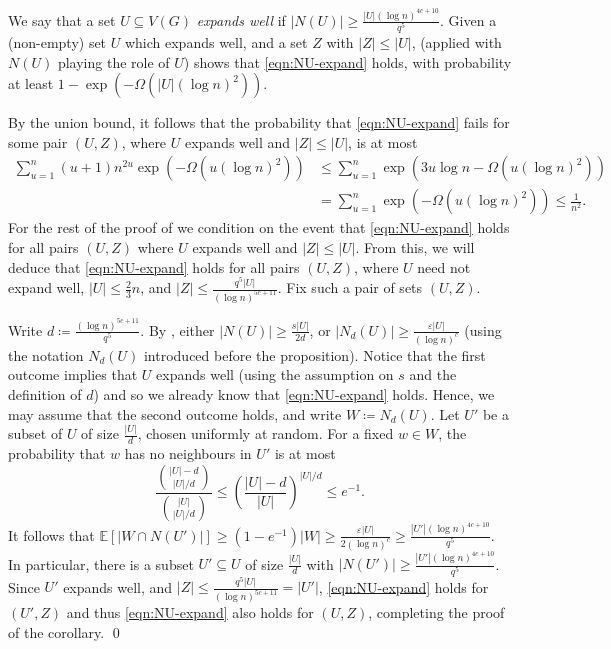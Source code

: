 \documentclass[10pt]{article}
\theoremstyle{plain}
\numberwithin{theorem}{section}
\theoremstyle{definition}
\theoremstyle{remark}
\renewenvironment{proof}[1][]{\begin{trivlist}
\item[\hspace{\labelsep}{\bf\noindent Proof#1.\/}] }{\qed\end{trivlist}}
\newcommand{\Ex}{\mathbb{E}}
\newcommand{\eps}{\varepsilon}
\theoremstyle{plain}
\begin{document}
		\begin{proof}
			We say that a set $U \subseteq V(G)$ \emph{expands well} if $|N(U)| \ge \frac{|U| (\log n)^{4c+10}}{q^5}$. Given a (non-empty) set $U$ which expands well, and a set $Z$ with $|Z| \le |U|$,  (applied with $N(U)$ playing the role of $U$) shows that \eqref{eqn:NU-expand} holds, with probability at least $1 - \exp\left(-\Omega\left(|U|(\log n)^{2}\right)\right)$.

			By the union bound, it follows that the probability that \eqref{eqn:NU-expand} fails for some pair $(U, Z)$, where $U$ expands well and $|Z| \le |U|$, is at most
			\begin{align*}
				\sum_{u = 1}^n (u+1) n^{2u} \exp\left(-\Omega\left(u(\log n)^{2}\right)\right)
				& \le \sum_{u = 1}^n \exp\left(3u \log n - \Omega\left(u(\log n)^2\right)\right) \\
				& = \sum_{u = 1}^n \exp\left(-\Omega\left(u (\log n)^2\right)\right) \le \frac{1}{n^2}.
			\end{align*}
			For the rest of the proof of  we condition on the event that \eqref{eqn:NU-expand} holds for all pairs $(U, Z)$ where $U$ expands well and $|Z| \le |U|$. 
			From this, we will deduce that \eqref{eqn:NU-expand} holds for all pairs $(U, Z)$, where $U$ need not expand well, $|U| \le \frac{2}{3}n$, and $|Z| \le \frac{q^5|U|}{(\log n)^{5c+11}}$. Fix such a pair of sets $(U, Z)$.

			Write $d \coloneqq \frac{ (\log n)^{5c+11}}{q^5}$. By , either $|N(U)| \ge \frac{s|U|}{2d}$, or $|N_d(U)| \ge \frac{\eps |U|}{(\log n)^{c}}$ (using the notation $N_d(U)$ introduced before the proposition). Notice that the first outcome implies that $U$ expands well (using the assumption on $s$ and the definition of $d$) and so we already know that \eqref{eqn:NU-expand} holds. Hence, we may assume that the second outcome holds, and write $W \coloneqq N_d(U)$. Let $U'$ be a subset of $U$ of size $\frac{|U|}{d}$, chosen uniformly at random. For a fixed $w \in W$, the probability that $w$ has no neighbours in $U'$ is at most
			\begin{equation*}
				\frac{\binom{|U|-d}{|U|/d}}{\binom{|U|}{|U|/d}} \le \left(\frac{|U|-d}{|U|}\right)^{|U|/d} \le e^{-1}.
			\end{equation*}
			It follows that $\Ex[|W \cap N(U')|] \ge (1 - e^{-1})|W| \ge \frac{\eps|U|}{2(\log n)^c} \ge \frac{|U'|(\log n)^{4c+10}}{q^5}$. In particular, there is a subset $U' \subseteq U$ of size $\frac{|U|}{d}$ with $|N(U')| \ge \frac{|U'| (\log n)^{4c+10}}{q^5}$. Since $U'$ expands well, and $|Z| \le \frac{q^5|U|}{(\log n)^{5c+11}} = |U'|$, \eqref{eqn:NU-expand} holds for $(U', Z)$ and thus \eqref{eqn:NU-expand} also holds for $(U, Z)$, completing the proof of the corollary. 
		\end{proof}	
\end{document}
